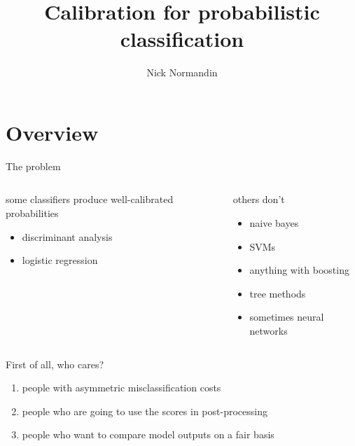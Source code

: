 \documentclass[ignorenonframetext,]{beamer}
\title{Calibration for probabilistic classification}
\subtitle{Nick Normandin}
\date{}
\providecommand{\tightlist}{%
\setlength{\itemsep}{0pt}\setlength{\parskip}{0pt}}
\begin{document}
\frame{\titlepage}

\section{Overview}\label{overview}

\begin{frame}{The problem}

\begin{columns}[t]
\begin{column}{0.48\textwidth}

\begin{block}{some classifiers produce well-calibrated probabilities}

\begin{itemize}
\item discriminant analysis
\item logistic regression
\end{itemize}

\end{block}
\end{column}


\begin{column}{0.48\textwidth}
\begin{block}{others don't}
\vspace{3mm}
\begin{itemize}
\item naive bayes
\item SVMs
\item anything with boosting
\item tree methods
\item sometimes neural networks
\end{itemize}
\end{block}

\end{column}
\end{columns}

\end{frame}

\begin{frame}{First of all, who cares?}

\begin{enumerate}
\def\labelenumi{\arabic{enumi}.}
\tightlist
\item
  people with asymmetric misclassification costs \vspace{2mm}
\item
  people who are going to use the scores in post-processing \vspace{2mm}
\item
  people who want to compare model outputs on a fair basis
\end{enumerate}

\end{frame}
\end{document}
